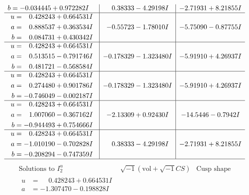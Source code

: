 \documentclass[1p]{elsarticle_modified}
\theoremstyle{definition}
\newcommand{\I}{\sqrt{-1}}
\begin{document}
$$\begin{array}{c|c|c}
\begin{aligned}
b &= -0.034445 + 0.972282 I\end{aligned}
 & \phantom{-}0.38333 - 4.29198 I & -2.71931 + 8.21855 I \\ \hline\begin{aligned}
u &= \phantom{-}0.428243 + 0.664531 I \\
a &= \phantom{-}0.888537 + 0.363534 I \\
b &= \phantom{-}0.084731 + 0.430342 I\end{aligned}
 & -0.55723 - 1.78010 I & -5.75090 - 0.87755 I \\ \hline\begin{aligned}
u &= \phantom{-}0.428243 + 0.664531 I \\
a &= \phantom{-}0.513515 - 0.791746 I \\
b &= \phantom{-}0.481721 - 0.568584 I\end{aligned}
 & -0.178329 - 1.323480 I & -5.91910 + 4.26937 I \\ \hline\begin{aligned}
u &= \phantom{-}0.428243 + 0.664531 I \\
a &= \phantom{-}0.274480 + 0.901786 I \\
b &= -0.746049 - 0.002187 I\end{aligned}
 & -0.178329 - 1.323480 I & -5.91910 + 4.26937 I \\ \hline\begin{aligned}
u &= \phantom{-}0.428243 + 0.664531 I \\
a &= \phantom{-}1.007060 - 0.367162 I \\
b &= -0.944493 + 0.754666 I\end{aligned}
 & -2.13309 + 0.92430 I & -14.5446 - 0.7942 I \\ \hline\begin{aligned}
u &= \phantom{-}0.428243 + 0.664531 I \\
a &= -1.010190 - 0.702828 I \\
b &= -0.208294 - 0.747359 I\end{aligned}
 & \phantom{-}0.38333 - 4.29198 I & -2.71931 + 8.21855 I\\
 \hline 
 \end{array}$$\newpage$$\begin{array}{c|c|c}  
\text{Solutions to }I^u_{2}& \I (\text{vol} + \sqrt{-1}CS) & \text{Cusp shape}\\
 \hline 
\begin{aligned}
u &= \phantom{-}0.428243 + 0.664531 I \\
a &= -1.307470 - 0.198828 I \\

\end{aligned}
\end{array}$$
\end{document}
